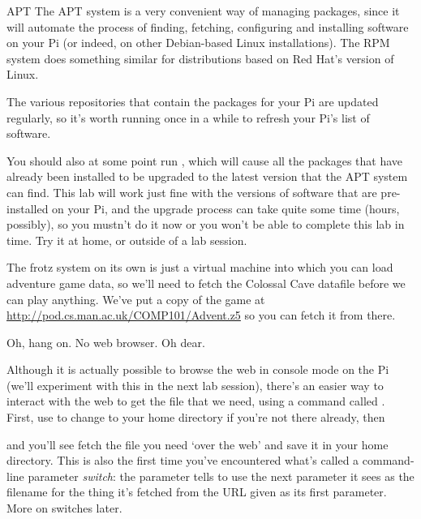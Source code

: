\begin{rpi}{APT}
The APT system is a very convenient way of managing packages, since it will automate the process of finding, fetching, configuring and installing software on your Pi (or indeed, on other Debian-based Linux installations). The RPM system does something similar for distributions based on Red Hat's version of Linux.

The various repositories that contain the packages for your Pi are updated regularly, so it's worth running  once in a while to refresh your Pi's list of software. 

You should also at some point run , which will cause all the packages that have already been installed to be upgraded to the latest version that the APT system can find. This lab will work just fine with the versions of software that are pre-installed on your Pi, and the upgrade process can take quite some time (hours, possibly), so you mustn't do it now or you won't be able to complete this lab in time. Try it at home, or outside of a lab session. 
\end{rpi}

The frotz system on its own is just a virtual machine into which you can load adventure game data, so we'll need to fetch the Colossal Cave datafile before we can play anything. We've put a copy of the game at \url{http://pod.cs.man.ac.uk/COMP101/Advent.z5} so you can fetch it from there.

Oh, hang on. No web browser. Oh dear.

Although it is actually possible to browse the web in console mode on the Pi (we'll experiment with this in the next lab session), there's an easier way to interact with the web to get the file that we need, using a command called . First, use  to change to your home directory if you're not there already, then


\noindent and you'll see  fetch the file you need `over the web' and save it in your home directory. This is also the first time you've encountered what's called a command-line parameter \textit{switch}: the  parameter tells  to use the next parameter it sees as the filename for the thing it's fetched from the URL given as its first parameter. More on switches later. 


